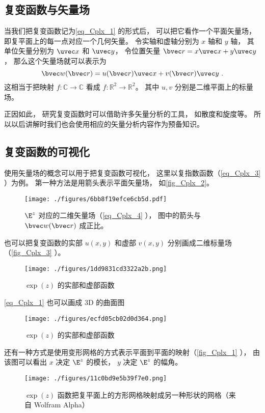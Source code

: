 \subsection{复变函数与矢量场}
当我们把复变函数记为\autoref{eq_Cplx_1} 的形式后， 可以把它看作一个平面矢量场， 即复平面上的每一点对应一个几何矢量。 令实轴和虚轴分别为 $x$ 轴和 $y$ 轴， 其单位矢量分别为 $\uvec x$ 和 $\uvec y$， 令位置矢量 $\bvec r = x \uvec x + y \uvec y$， 那么这个矢量场就可以表示为
\begin{equation}\label{eq_Cplx_4}
\bvec w(\bvec r) = u(\bvec r) \uvec x + v(\bvec r) \uvec y~.
\end{equation}
这相当于把映射 $f:\mathbb C \to \mathbb C$ 看成 $f: \mathbb R^2 \to \mathbb R^2$。 其中 $u, v$ 分别是二维平面上的标量场。

正因如此， 研究复变函数时可以借助许多矢量分析的工具， 如散度和旋度等。 所以以后讲解时我们也会使用相应的矢量分析内容作为预备知识。

\subsection{复变函数的可视化}
使用矢量场的概念可以用于把复变函数可视化， 这里以复指数函数（\autoref{eq_Cplx_3} ）为例。 第一种方法是用箭头表示平面矢量场， 如\autoref{fig_Cplx_2}。
\begin{figure}[ht]
\centering
\texttt{[image: ./figures/6bb8f19efce6cb5d.pdf]}
\caption{$\E^z$ 对应的二维矢量场（\autoref{eq_Cplx_4} ）， 图中的箭头与 $\bvec w(\bvec r)$ 成正比。} \label{fig_Cplx_2}
\end{figure}
也可以把复变函数的实部 $u(x,y)$ 和虚部 $v(x, y)$ 分别画成二维标量场（\autoref{fig_Cplx_3} ）。
\begin{figure}[ht]
\centering
\texttt{[image: ./figures/1dd9831cd3322a2b.png]}
\caption{$\exp(z)$ 的实部和虚部函数} \label{fig_Cplx_3}
\end{figure}
\autoref{eq_Cplx_1} 也可以画成 3D 的曲面图
\begin{figure}[ht]
\centering
\texttt{[image: ./figures/ecfd05cb02d0d364.png]}
\caption{$\exp(z)$ 的实部和虚部函数} \label{fig_Cplx_4}
\end{figure}

还有一种方式是使用变形网格的方式表示平面到平面的映射（\autoref{fig_Cplx_1} ）， 由该图可以看出 $x$ 决定 $\E^z$ 的模长， $y$ 决定 $\E^z$ 的幅角。
\begin{figure}[ht]
\centering
\texttt{[image: ./figures/11c0bd9e5b39f7e0.png]}
\caption{$\exp(z)$ 函数把复平面上的方形网格映射成另一种形状的网格（来自 Wolfram Alpha）} \label{fig_Cplx_1}
\end{figure}

